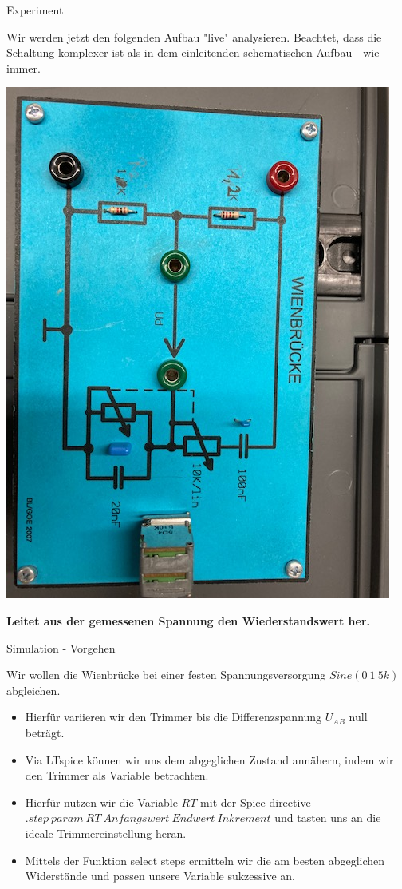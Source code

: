 \begin{frame}[t]{Experiment}

  Wir werden jetzt den folgenden Aufbau "live" analysieren. Beachtet, dass die Schaltung komplexer ist als in dem einleitenden schematischen Aufbau - wie immer.

  \begin{spacing}{0.9} \begin{tiny}
      \begin{minipage}{\textwidth}
        \includegraphics[width=0.5\linewidth]{pictures/wheatstone_bridge.jpg}
      \end{minipage}
    \end{tiny} \end{spacing}

  \textbf{Leitet aus der gemessenen Spannung den Wiederstandswert her.}

\end{frame}


\begin{frame}[t]{Simulation - Vorgehen}

  Wir wollen die Wienbrücke bei einer festen Spannungsversorgung $Sine(0\ 1\ 5k)$ abgleichen.
  \begin{itemize}
    \item Hierfür variieren wir den Trimmer bis die Differenzspannung $U_{AB}$ null beträgt.
    \item Via LTspice können wir uns dem abgeglichen Zustand annähern, indem wir den Trimmer als Variable betrachten.
    \item Hierfür nutzen wir die Variable $RT$ mit der Spice directive $.step\ param\ RT\ Anfangswert\ Endwert\ Inkrement$ und tasten uns an die ideale Trimmereinstellung heran.
    \item Mittels der Funktion select steps ermitteln wir die am besten abgeglichen Widerstände und passen unsere Variable sukzessive an.
  \end{itemize}

\end{frame}

